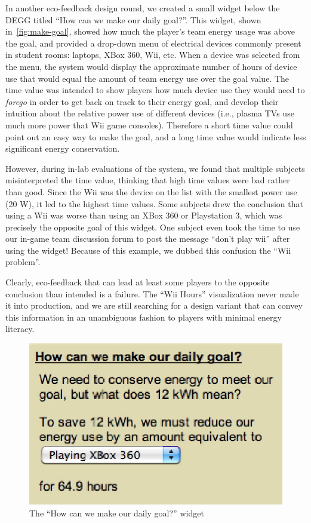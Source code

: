 \documentclass{sigchi}
\begin{document}
In another eco-feedback design round,  we created a small widget below the DEGG titled ``How can we make our daily goal?''. This widget, shown in~\autoref{fig:make-goal}, showed how much the player's team energy usage was above the goal, and provided a drop-down menu of electrical devices commonly present in student rooms: laptops, XBox 360, Wii, etc. When a device was selected from the menu, the system would display the approximate number of hours of device use that would equal the amount of team energy use over the goal value. The time value was intended to show players how much device use they would need to \emph{forego} in order to get back on track to their energy goal, and develop their intuition about the relative power use of different devices (i.e., plasma TVs use much more power that Wii game consoles). Therefore a short time value could point out an easy way to make the goal, and a long time value would indicate less significant energy conservation.

However, during in-lab evaluations of the system, we found that multiple subjects misinterpreted the time value, thinking that high time values were bad rather than good. Since the Wii was the device on the list with the smallest power use (20 W), it led to the highest time values. Some subjects drew the conclusion that using a Wii was worse than using an XBox 360 or Playstation 3, which was precisely the opposite goal of this widget. One subject even took the time to use our in-game team discussion forum to post the message ``don't play wii'' after using the widget! Because of this example, we dubbed this confusion the ``Wii problem''.

Clearly, eco-feedback that can lead at least some players to the opposite conclusion than intended is a failure.   The ``Wii Hours'' visualization never made it into production, and we are still searching for a design variant that can convey this information in an unambiguous fashion to players with minimal energy literacy.

\begin{figure}[!t]
\centering
\includegraphics[width=0.6\columnwidth]{how-meet-goal.eps}
\caption{The ``How can we make our daily goal?'' widget}
\label{fig:make-goal}
\end{figure}
\end{document}
